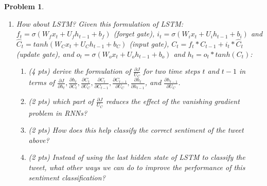 \documentclass{article}
\newtheorem{problem}{Problem}
\begin{document}
\begin{problem}
\begin{enumerate}
    \item How about LSTM? Given this formulation of LSTM: $f_t = \sigma (W_f x_t + U_f h_{t-1} + b_f)$ (forget gate), $i_t = \sigma (W_i x_t + U_i h_{t-1} + b_i)$ and $\hat{C}_t = tanh(W_C x_t + U_C h_{t-1} + b_C)$ (input gate), $C_t = f_t * C_{t-1} + i_t * \hat{C}_t$ (update gate), and $o_t = \sigma (W_o x_t + U_o h_{t-1} + b_o)$ and $h_t = o_t * tanh (C_t)$:
    \begin{enumerate}
        \item (4 pts) derive the formulation of $\frac{\partial J}{U_C}$ for two time steps $t$ and $t-1$ in terms of $\frac{\partial J}{\partial h_{t}}, \frac{\partial h_t}{\partial C_t}, \frac{\partial C_t}{\partial U_C}, \frac{\partial C_t}{\partial C_{t-1}}, \frac{\partial C_{t-1}}{\partial U_C},  \frac{\partial h_t}{\partial h_{t-1}}$, and $\frac{\partial h_{t-1}}{\partial U_C}$.
        \item (2 pts) which part of $\frac{\partial J}{U_C}$ reduces the effect of the vanishing gradient problem in RNNs?
        \item (2 pts) How does this help classify the correct sentiment of the tweet above? 
        \item (2 pts) Instead of using the last hidden state of LSTM to classify the tweet, what other ways we can do to improve the performance of this sentiment classification?\\
    \end{enumerate}
\end{enumerate}
\end{problem}
\end{document}
